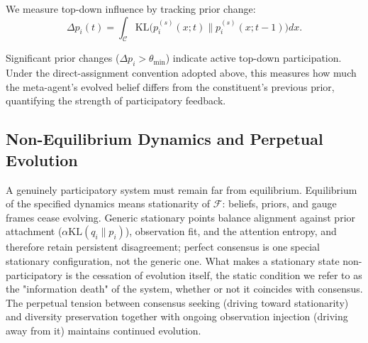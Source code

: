 \documentclass[11pt]{article}
\begin{document}
We measure top-down influence by tracking prior change:
\begin{equation}
\Delta p_i(t) = \int_{\mathcal{C}} \mathrm{KL}\big(p_i^{(s)}(x; t) \| p_i^{(s)}(x; t-1)\big)  dx.
\end{equation}

Significant prior changes ($\Delta p_i > \theta_{\min}$) indicate active top-down participation. Under the direct-assignment convention adopted above, this measures how much the meta-agent's evolved belief differs from the constituent's previous prior, quantifying the strength of participatory feedback.

\subsection{Non-Equilibrium Dynamics and Perpetual Evolution}

A genuinely participatory system must remain far from equilibrium. Equilibrium of the specified dynamics means stationarity of $\mathcal{F}$: beliefs, priors, and gauge frames cease evolving. Generic stationary points balance alignment against prior attachment ($\alpha\mathrm{KL}(q_i \| p_i)$), observation fit, and the attention entropy, and therefore retain persistent disagreement; perfect consensus is one special stationary configuration, not the generic one. What makes a stationary state non-participatory is the cessation of evolution itself, the static condition we refer to as the "information death" of the system, whether or not it coincides with consensus. The perpetual tension between consensus seeking (driving toward stationarity) and diversity preservation together with ongoing observation injection (driving away from it) maintains continued evolution.
\end{document}

